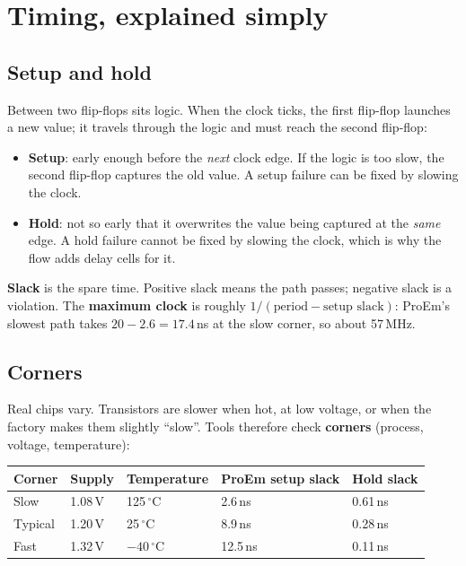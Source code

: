 \documentclass[11pt,a4paper]{article}
\begin{document}
\section{Timing, explained simply}\label{sec:timing}

\subsection{Setup and hold}

Between two flip-flops sits logic. When the clock ticks, the first flip-flop launches a new value; it travels through the logic and must reach the second flip-flop:
\begin{itemize}
\item \textbf{Setup}: early enough before the \emph{next} clock edge. If the logic is too slow, the second flip-flop captures the old value. A setup failure can be fixed by slowing the clock.
\item \textbf{Hold}: not so early that it overwrites the value being captured at the \emph{same} edge. A hold failure cannot be fixed by slowing the clock, which is why the flow adds delay cells for it.
\end{itemize}

\textbf{Slack} is the spare time. Positive slack means the path passes; negative slack is a violation. The \textbf{maximum clock} is roughly $1 / (\text{period} - \text{setup slack})$: ProEm's slowest path takes $20 - 2.6 = 17.4$\,ns at the slow corner, so about 57\,MHz.

\subsection{Corners}

Real chips vary. Transistors are slower when hot, at low voltage, or when the factory makes them slightly ``slow''. Tools therefore check \textbf{corners} (process, voltage, temperature):

\begin{center}
\begin{tabular}{@{}lllll@{}}
\toprule
Corner & Supply & Temperature & ProEm setup slack & Hold slack \\
\midrule
Slow & 1.08\,V & 125\,$^\circ$C & 2.6\,ns & 0.61\,ns \\
Typical & 1.20\,V & 25\,$^\circ$C & 8.9\,ns & 0.28\,ns \\
Fast & 1.32\,V & $-40\,^\circ$C & 12.5\,ns & 0.11\,ns \\
\bottomrule
\end{tabular}
\end{center}
\end{document}
